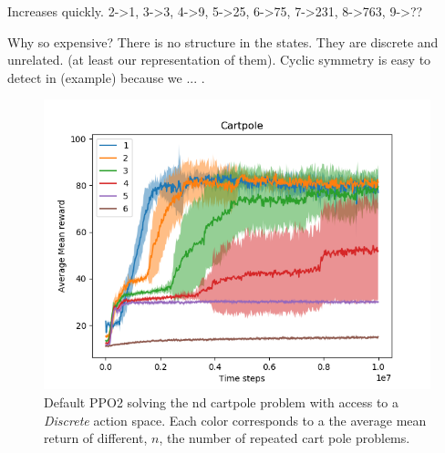 Increases quickly. 2->1, 3->3, 4->9, 5->25, 6->75, 7->231, 8->763, 9->??

Why so expensive? There is no structure in the states. They are discrete and unrelated.
(at least our representation of them). Cyclic symmetry is easy to detect in (example) because
we ... .


\begin{figure}[h!]
\centering
\includegraphics[width=1\textwidth,height=0.5\textheight]{../../pictures/figures/discrete-nd-cart.png}
\caption{Default PPO2 solving the nd cartpole problem with access to a \textit{Discrete} action space. Each color corresponds to a the average mean return of different, $n$, the number of repeated cart pole problems.}
\end{figure}
